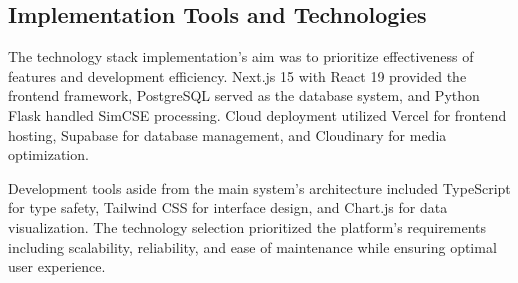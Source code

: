 {%








\subsection{Implementation Tools and Technologies}

The technology stack implementation's aim was to prioritize effectiveness of features and development efficiency. Next.js 15 with React 19 provided the frontend framework, PostgreSQL served as the database system, and Python Flask handled SimCSE processing. Cloud deployment utilized Vercel for frontend hosting, Supabase for database management, and Cloudinary for media optimization.

Development tools aside from the main system's architecture included TypeScript for type safety, Tailwind CSS for interface design, and Chart.js for data visualization. The technology selection prioritized the platform's requirements including scalability, reliability, and ease of maintenance while ensuring optimal user experience.
}

